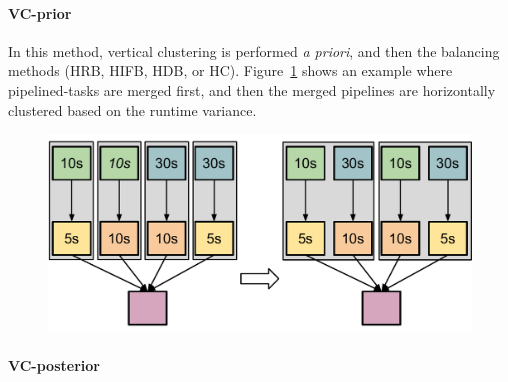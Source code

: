 
\paragraph{\textbf{VC-prior}}
In this method, vertical clustering is performed \emph{a priori}, and then the balancing methods (HRB, HIFB, HDB, or HC). Figure~\ref{fig:imbalance_vc_prior} shows an example where pipelined-tasks are merged first, and then the merged pipelines are horizontally clustered based on the runtime variance.

\begin{figure}[!htb]
	\centering
	\includegraphics[width=0.85\linewidth]{figures/imbalance/vertical_clustering_prior.pdf}
	\label{fig:imbalance_vc_prior}
\end{figure}

\paragraph{\textbf{VC-posterior}} 

